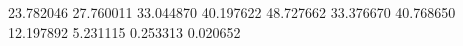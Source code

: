 23.782046
27.760011
33.044870
40.197622
48.727662
33.376670
40.768650
12.197892
5.231115
0.253313
0.020652
